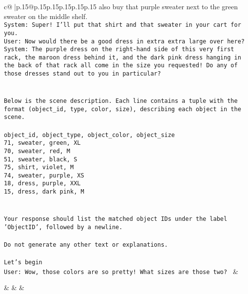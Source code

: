 \documentclass{article}
\begin{document}
{\begin{supertabular}{c@{$\;$}|p{.15\linewidth}@{}p{.15\linewidth}p{.15\linewidth}p{.15\linewidth}p{.15\linewidth}p{.15\linewidth}}
{{{also buy that purple sweater next to the green sweater on the middle shelf.\\ \tt System: Super! I'll put that shirt and that sweater in your cart for you.\\ \tt User: Now would there be a good dress in extra extra large over here?\\ \tt System: The purple dress on the right-hand side of this very first rack, the maroon dress behind it, and the dark pink dress hanging in the back of that rack all come in the size you requested! Do any of those dresses stand out to you in particular?\\ \tt \\ \tt \\ \tt Below is the scene description. Each line contains a tuple with the format (object_id, type, color, size), describing each object in the scene.\\ \tt \\ \tt object_id, object_type, object_color, object_size\\ \tt 71, sweater, green, XL\\ \tt 70, sweater, red, M\\ \tt 51, sweater, black, S\\ \tt 75, shirt, violet, M\\ \tt 74, sweater, purple, XS\\ \tt 18, dress, purple, XXL\\ \tt 15, dress, dark pink, M\\ \tt \\ \tt \\ \tt Your response should list the matched object IDs under the label 'ObjectID', followed by a newline.\\ \tt \\ \tt Do not generate any other text or explanations.\\ \tt \\ \tt Let's begin\\ \tt User: Wow, those colors are so pretty! What sizes are those two? 
	  } 
	   } 
	   } 
	 & \\ 
 

    \theutterance {}  

    &  
	 & & \\ 
 


\end{supertabular}}
\end{document}
